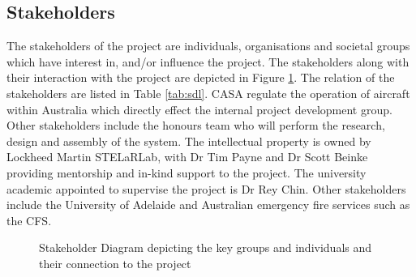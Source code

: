 \subsection{Stakeholders}

The stakeholders of the project are individuals, organisations and societal groups which have interest in, and/or influence the project. The stakeholders along with their interaction with the project are depicted in Figure \ref{fig:stakeholder}. The relation of the stakeholders are listed in Table \ref{tab:sdl}. CASA regulate the operation of aircraft within Australia which directly effect the internal project development group. Other stakeholders include the honours team who will perform the research, design and assembly of the system. The intellectual property is owned by Lockheed Martin STELaRLab, with Dr Tim Payne and Dr Scott Beinke providing mentorship and in-kind support to the project. The university academic appointed to supervise the project is Dr Rey Chin. Other stakeholders include the University of Adelaide and Australian emergency fire services such as the CFS.



\begin{figure}[H]
    \centering
    
    \caption[Stakeholder Diagram]{Stakeholder Diagram depicting the key groups and individuals and their connection to the project}
    \label{fig:stakeholder}
\end{figure}

\begin{table}[H]
\centering
\caption{Legend for connections on the Stakeholder Diagram} 
\label{tab:sdl}
\end{table}

